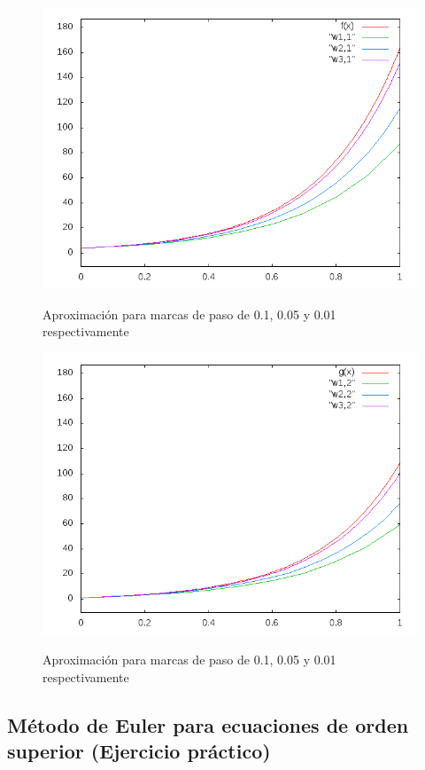 \documentclass[12pt]{article}       %
\begin{document}
    \begin{figure}[H]
    	\centering
    	\includegraphics[scale=0.65]{img/grafica2.png}
    	\label{figura1}
    	\caption{Aproximación para marcas de paso de 0.1, 0.05 y 0.01 respectivamente} 
    \end{figure}
    
    \begin{figure}[H]
    	\centering
    	\includegraphics[scale=0.65]{img/grafica3.png}
    	\label{figura1}
    	\caption{Aproximación para marcas de paso de 0.1, 0.05 y 0.01 respectivamente} 
    \end{figure}

\subsection{Método de Euler para ecuaciones de orden superior (Ejercicio práctico)}
\end{document}

